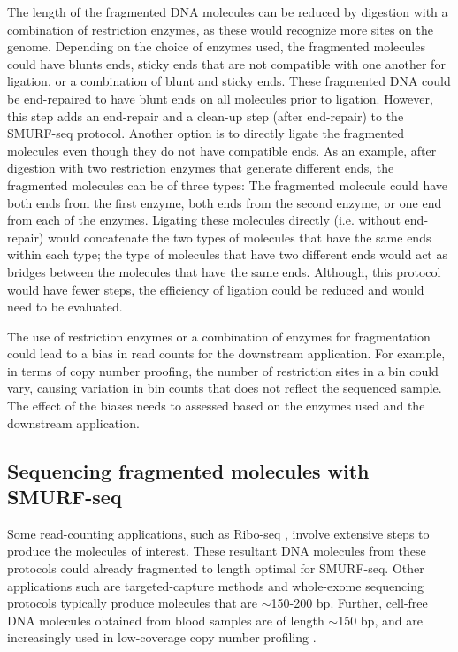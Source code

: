 The length of the fragmented DNA molecules can be reduced by digestion
with a combination of restriction enzymes, as these would recognize more
sites on the genome. Depending on the choice of enzymes used, the
fragmented molecules could have blunts ends, sticky ends that are not
compatible with one another for ligation, or a combination of blunt and
sticky ends.
%
These fragmented DNA could be end-repaired to have blunt ends on all
molecules prior to ligation. However, this step adds an end-repair and a
clean-up step (after end-repair) to the SMURF-seq protocol.
%
Another option is to directly ligate the fragmented molecules even
though they do not have compatible ends. As an example, after digestion
with two restriction enzymes that generate different ends, the
fragmented molecules can be of three types: The fragmented molecule
could have both ends from the first enzyme, both ends from the second
enzyme, or one end from each of the enzymes. Ligating these molecules
directly (i.e. without end-repair) would concatenate the two types of
molecules that have the same ends within each type; the type of
molecules that have two different ends would act as bridges between the
molecules that have the same ends. Although, this protocol would have
fewer steps, the efficiency of ligation could be reduced and would need
to be evaluated.

The use of restriction enzymes or a combination of enzymes for
fragmentation could lead to a bias in read counts for the downstream
application. For example, in terms of copy number proofing, the number
of restriction sites in a bin could vary, causing variation in bin
counts that does not reflect the sequenced sample. The effect of the
biases needs to assessed based on the enzymes used and the downstream
application.


\subsection*{Sequencing fragmented molecules with SMURF-seq}
Some read-counting applications, such as Ribo-seq
\citep{ingolia2009genome}, involve extensive steps to produce the
molecules of interest. These resultant DNA molecules from these
protocols could already fragmented to length optimal for SMURF-seq.
Other applications such are targeted-capture methods and whole-exome
sequencing protocols typically produce molecules that are $\sim$150-200
bp. Further, cell-free DNA molecules obtained from blood samples are of
length $\sim$150 bp, and are increasingly used in low-coverage copy
number profiling \citep{underhill2016fragment,
adalsteinsson2017scalable}.


